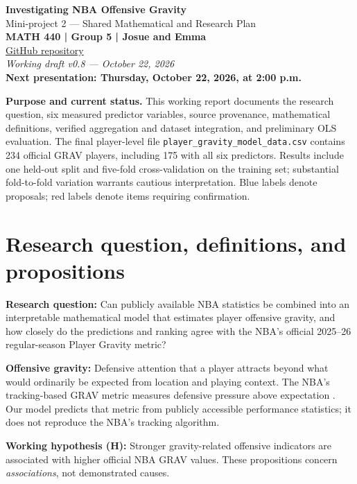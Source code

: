 \documentclass[11pt]{article}
\begin{document}
\begin{center}
    {\LARGE\bfseries Investigating NBA Offensive Gravity}\\[5pt]
    {\large Mini-project 2 --- Shared Mathematical and Research Plan}\\[8pt]
    \textbf{MATH 440 | Group 5 | Josue and Emma}\\[3pt]
    \href{https://github.com/katnissali/NBA-Gravity}{GitHub repository}\\[3pt]
    \textit{Working draft v0.8 --- October 22, 2026}\\[3pt]
    \textbf{Next presentation: Thursday, October 22, 2026, at 2:00 p.m.}
\end{center}

\noindent\colorbox{blue!5}{\parbox{\dimexpr\linewidth-2\fboxsep\relax}{\textbf{Purpose and current status.} This working report documents the research question, six measured predictor variables, source provenance, mathematical definitions, verified aggregation and dataset integration, and preliminary OLS evaluation. The final player-level file \texttt{player\_gravity\_model\_data.csv} contains 234 official GRAV players, including 175 with all six predictors. Results include one held-out split and five-fold cross-validation on the training set; substantial fold-to-fold variation warrants cautious interpretation. Blue labels denote proposals; red labels denote items requiring confirmation.}}

\setcounter{tocdepth}{1}
\tableofcontents
\medskip

\section{Research question, definitions, and propositions}
\textbf{Research question:} Can publicly available NBA statistics be combined into
an interpretable mathematical model that estimates player offensive gravity,
and how closely do the predictions and ranking agree with the NBA's official
2025--26 regular-season Player Gravity metric?

\textbf{Offensive gravity:} Defensive attention that a player attracts beyond
what would ordinarily be expected from location and playing context. The NBA's
tracking-based GRAV metric measures defensive pressure above expectation
\cite{nba-gravity-intro,nba-gravity-board}. Our model predicts that
metric from publicly accessible performance statistics; it does not reproduce
the NBA's tracking algorithm.

\textbf{Working hypothesis (H):} Stronger gravity-related offensive indicators
are associated with higher official NBA GRAV values. These propositions concern
\emph{associations}, not demonstrated causes.
\end{document}
